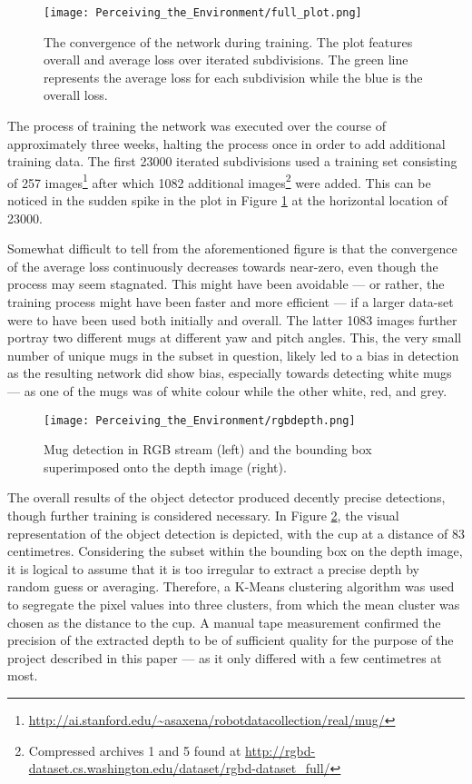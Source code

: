 \begin{figure}[h!]
\centering
\texttt{[image: Perceiving\_the\_Environment/full\_plot.png]}
\caption{The convergence of the network during training. The plot features overall and average loss over iterated subdivisions. The green line represents the average loss for each subdivision while the blue is the overall loss.}
\label{fig:od_training}
\end{figure}

The process of training the network was executed over the course of approximately three weeks, halting the process once in order to add additional training data. The first 23000 iterated subdivisions used a training set consisting of 257 images\footnote{\url{http://ai.stanford.edu/~asaxena/robotdatacollection/real/mug/}} after which 1082 additional images\footnote{Compressed archives 1 and 5 found at \url{http://rgbd-dataset.cs.washington.edu/dataset/rgbd-dataset_full/}} were added. This can be noticed in the sudden spike in the plot in Figure \ref{fig:od_training} at the horizontal location of 23000.

Somewhat difficult to tell from the aforementioned figure is that the convergence of the average loss continuously decreases towards near-zero, even though the process may seem stagnated. This might have been avoidable --- or rather, the training process might have been faster and more efficient --- if a larger data-set were to have been used both initially and overall. The latter 1083 images further portray two different mugs at different yaw and pitch angles. This, the very small number of unique mugs in the subset in question, likely led to a bias in detection as the resulting network did show bias, especially towards detecting white mugs --- as one of the mugs was of white colour while the other white, red, and grey.


\begin{figure}[h!]
\centering
\texttt{[image: Perceiving\_the\_Environment/rgbdepth.png]}
\caption{Mug detection in RGB stream (left) and the bounding box superimposed onto the depth image (right).}
\label{fig:od_detect}
\end{figure}

The overall results of the object detector produced decently precise detections, though further training is considered necessary. 
In Figure \ref{fig:od_detect}, the visual representation of the object detection is depicted, with the cup at a distance of 83 centimetres. Considering the subset within the bounding box on the depth image, it is logical to assume that it is too irregular to extract a precise depth by random guess or averaging. Therefore, a K-Means clustering algorithm was used to segregate the pixel values into three clusters, from which the mean cluster was chosen as the distance to the cup. A manual tape measurement confirmed the precision of the extracted depth to be of sufficient quality for the purpose of the project described in this paper --- as it only differed with a few centimetres at most.

